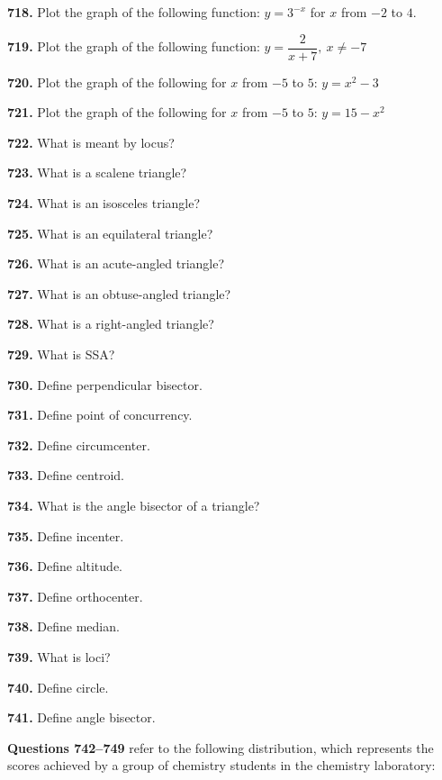 \documentclass[11pt]{article}
\begin{document}
\bigskip
\noindent\textbf{718.} Plot the graph of the following function: $y=3^{-x}$ for $x$ from $-2$ to $4$.

\bigskip
\noindent\textbf{719.} Plot the graph of the following function: $y=\dfrac{2}{x+7},\ x\neq-7$

\bigskip
\noindent\textbf{720.} Plot the graph of the following for $x$ from $-5$ to $5$: $y=x^2-3$

\bigskip
\noindent\textbf{721.} Plot the graph of the following for $x$ from $-5$ to $5$: $y=15-x^2$

\bigskip
\noindent\textbf{722.} What is meant by locus?

\bigskip
\noindent\textbf{723.} What is a scalene triangle?

\bigskip
\noindent\textbf{724.} What is an isosceles triangle?

\bigskip
\noindent\textbf{725.} What is an equilateral triangle?

\bigskip
\noindent\textbf{726.} What is an acute-angled triangle?

\bigskip
\noindent\textbf{727.} What is an obtuse-angled triangle?

\bigskip
\noindent\textbf{728.} What is a right-angled triangle?

\bigskip
\noindent\textbf{729.} What is SSA?

\bigskip
\noindent\textbf{730.} Define perpendicular bisector.

\bigskip
\noindent\textbf{731.} Define point of concurrency.

\bigskip
\noindent\textbf{732.} Define circumcenter.

\bigskip
\noindent\textbf{733.} Define centroid.

\bigskip
\noindent\textbf{734.} What is the angle bisector of a triangle?

\bigskip
\noindent\textbf{735.} Define incenter.

\bigskip
\noindent\textbf{736.} Define altitude.

\bigskip
\noindent\textbf{737.} Define orthocenter.

\bigskip
\noindent\textbf{738.} Define median.

\bigskip
\noindent\textbf{739.} What is loci?

\bigskip
\noindent\textbf{740.} Define circle.

\bigskip
\noindent\textbf{741.} Define angle bisector.


\bigskip
\noindent\textbf{Questions 742--749} refer to the following distribution, which represents the scores achieved by a group of chemistry students in the chemistry laboratory:
\end{document}
